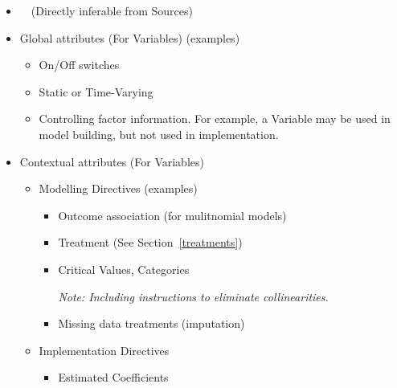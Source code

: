 \documentclass[10pt]{article}
\begin{document}
\begin{itemize}[label=-,noitemsep,topsep=0pt]
                    \item ~~(Directly inferable from Sources)
                    \item Global attributes (For Variables) (examples)
                        \begin{itemize}[label=-,noitemsep,topsep=0pt]
                            \item On/Off switches
                            \item Static or Time-Varying
                            \item Controlling factor information.  For example,
                                a Variable may be used in model building, but not used in 
                                implementation.
                        \end{itemize}
                    \item Contextual attributes (For Variables)
                        \begin{itemize}[label=-,noitemsep,topsep=0pt]
                            \item Modelling Directives (examples)
                                \begin{itemize}[label=-,noitemsep,topsep=0pt]
                                    \item Outcome association (for mulitnomial models)
                                    \item Treatment (See Section~\ref{treatments})
                                    \item Critical Values, Categories\par
                                        {\em Note: Including instructions to eliminate collinearities.}
                                    \item Missing data treatments (imputation)
                                \end{itemize}
                            \item Implementation Directives
                                \begin{itemize}[label=-,noitemsep,topsep=0pt]
                                    \item Estimated Coefficients
                                \end{itemize}
                        \end{itemize}
                \end{itemize}
\end{document}
